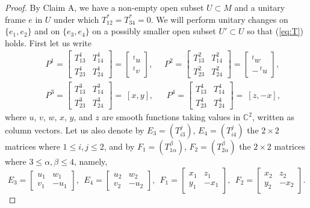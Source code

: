 \documentclass{amsart}
\begin{document}
\begin{proof}
By Claim A, we have a non-empty open subset $U\subset M$ and a unitary frame $e$ in $U$ under which $T^{\ast}_{12}=T^{\ast}_{34}=0$. We will perform unitary changes on $\{ e_1, e_2\}$ and on $\{ e_3, e_4\}$ on a possibly smaller open subset $U'\subset U$ so that (\ref{eq:T}) holds. First let us write
\begin{eqnarray*}
&&  P^1=  \left[ \begin{array}{cc} T^1_{13} & T^1_{14} \\ T^1_{23} & T^1_{24} \end{array} \right]  = \left[ \begin{array}{c} ^t\!u \\ ^t\!v \end{array} \right] ,  \ \ \ \ \ \ P^2=  \left[ \begin{array}{cc} T^2_{13} & T^2_{14} \\ T^2_{23} & T^2_{24} \end{array} \right]  = \left[ \begin{array}{c} ^t\!w \\ -\,^t\!u \end{array} \right] ,\\
&& P^3=  \left[ \begin{array}{cc} T^3_{13} & T^3_{14} \\ T^3_{23} & T^3_{24} \end{array} \right]  = \ \left[  x ,y \right] ,  \ \ \ \ \ \ \  P^4=  \left[ \begin{array}{cc} T^4_{13} & T^4_{14} \\ T^4_{23} & T^4_{24} \end{array} \right]  = \ \left[  z , -x  \right] ,
\end{eqnarray*}
where $u$, $v$, $w$, $x$, $y$, and $z$ are smooth functions taking values in ${\mathbb C}^2$, written as column vectors. Let us also denote by $E_3=(T^j_{i3})$, $E_4=(T^j_{i4})$ the $2\times 2$ matrices where $1\leq i,j\leq 2$, and by $F_1=(T^{\beta}_{1\alpha})$, $F_2=(T^{\beta}_{2\alpha})$ the $2\times 2$ matrices where $3\leq \alpha , \beta \leq 4$, namely,
$$ E_3 = \left[ \begin{array}{cc} u_1 & w_1 \\ v_1 & -u_1 \end{array} \right], \ \ E_4 = \left[ \begin{array}{cc} u_2 & w_2 \\ v_2 & -u_2 \end{array} \right],\ \  F_1 = \left[ \begin{array}{cc} x_1 & z_1 \\ y_1 & -x_1 \end{array} \right], \ \ F_2 = \left[ \begin{array}{cc} x_2 & z_2 \\ y_2 & -x_2 \end{array} \right]. $$


\end{proof}
\end{document}
